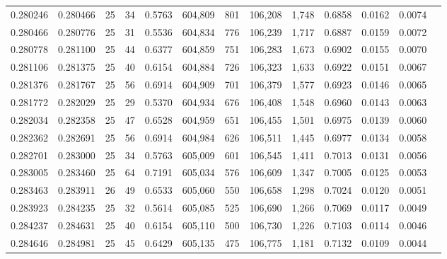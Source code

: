 \begin{tabular}{rrrrrrrrrrrrr}
0.280246 & 0.280466 &    25 &  34 &                                     0.5763 & 604,809 &     801 & 106,208 &   1,748 & 0.6858 & 0.0162 & 0.0074 \\
0.280466 & 0.280776 &    25 &  31 &                                     0.5536 & 604,834 &     776 & 106,239 &   1,717 & 0.6887 & 0.0159 & 0.0072 \\
0.280778 & 0.281100 &    25 &  44 &                                     0.6377 & 604,859 &     751 & 106,283 &   1,673 & 0.6902 & 0.0155 & 0.0070 \\
0.281106 & 0.281375 &    25 &  40 &                                     0.6154 & 604,884 &     726 & 106,323 &   1,633 & 0.6922 & 0.0151 & 0.0067 \\
0.281376 & 0.281767 &    25 &  56 &                                     0.6914 & 604,909 &     701 & 106,379 &   1,577 & 0.6923 & 0.0146 & 0.0065 \\
0.281772 & 0.282029 &    25 &  29 &                                     0.5370 & 604,934 &     676 & 106,408 &   1,548 & 0.6960 & 0.0143 & 0.0063 \\
0.282034 & 0.282358 &    25 &  47 &                                     0.6528 & 604,959 &     651 & 106,455 &   1,501 & 0.6975 & 0.0139 & 0.0060 \\
0.282362 & 0.282691 &    25 &  56 &                                     0.6914 & 604,984 &     626 & 106,511 &   1,445 & 0.6977 & 0.0134 & 0.0058 \\
0.282701 & 0.283000 &    25 &  34 &                                     0.5763 & 605,009 &     601 & 106,545 &   1,411 & 0.7013 & 0.0131 & 0.0056 \\
0.283005 & 0.283460 &    25 &  64 &                                     0.7191 & 605,034 &     576 & 106,609 &   1,347 & 0.7005 & 0.0125 & 0.0053 \\
0.283463 & 0.283911 &    26 &  49 &                                     0.6533 & 605,060 &     550 & 106,658 &   1,298 & 0.7024 & 0.0120 & 0.0051 \\
0.283923 & 0.284235 &    25 &  32 &                                     0.5614 & 605,085 &     525 & 106,690 &   1,266 & 0.7069 & 0.0117 & 0.0049 \\
0.284237 & 0.284631 &    25 &  40 &                                     0.6154 & 605,110 &     500 & 106,730 &   1,226 & 0.7103 & 0.0114 & 0.0046 \\
0.284646 & 0.284981 &    25 &  45 &                                     0.6429 & 605,135 &     475 & 106,775 &   1,181 & 0.7132 & 0.0109 & 0.0044 \\

\end{tabular}
